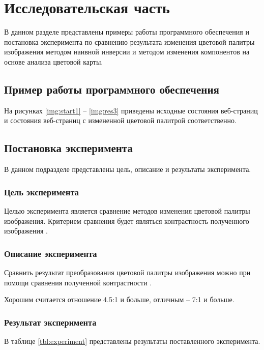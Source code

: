 \chapter{Исследовательская часть}

В данном разделе представлены примеры работы программного обеспечения и постановка эксперимента по сравнению результата изменения цветовой палитры изображения методом наивной инверсии и методом изменения компонентов на основе анализа цветовой карты.

\section{Пример работы программного обеспечения}

На рисунках \ref{img:start1} -- \ref{img:res3} приведены исходные состояния веб-страниц и состояния веб-страниц с измененной цветовой палитрой соответственно.

\section{Постановка эксперимента}

В данном подразделе представлены цель, описание и результаты эксперимента.

\subsection{Цель эксперимента}

Целью эксперимента является сравнение методов изменения цветовой палитры изображения. Критерием сравнения будет являться контрастность полученного изображения \cite{wcag1}.

\subsection{Описание эксперимента}

Сравнить результат преобразования цветовой палитры изображения можно при помощи сравнения полученной контрастности \cite{wcagcontrast}.

Хорошим считается отношение 4.5:1 и больше, отличным -- 7:1 и больше.

\subsection{Результат эксперимента}

В таблице \ref{tbl:experiment} представлены результаты поставленного эксперимента.

